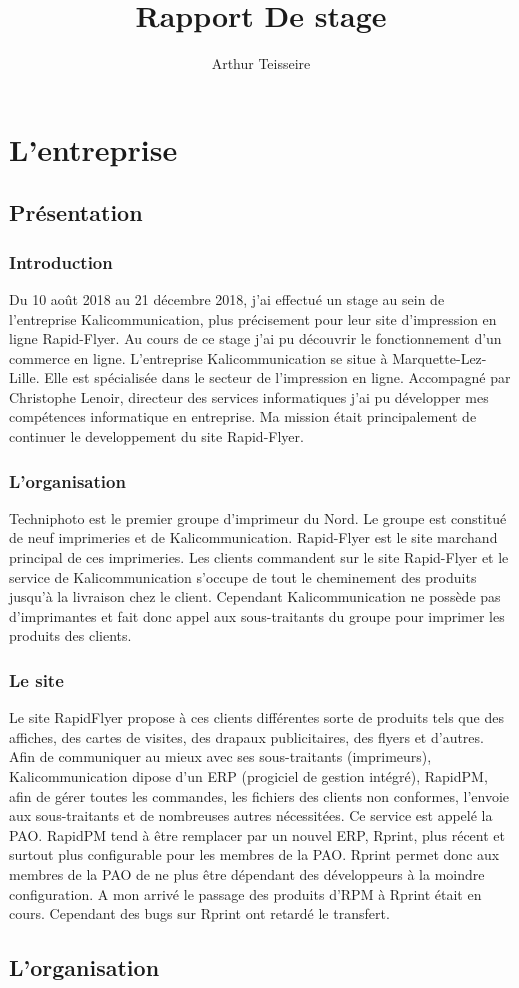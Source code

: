 \documentclass[a4paper]{report}
\title{Rapport De stage}
\author{Arthur Teisseire}
\begin{document}
\tableofcontents
\part{L'entreprise}
\chapter{Présentation}
\section{Introduction}
Du 10 août 2018 au 21 décembre 2018, j'ai effectué un stage au sein de l'entreprise Kalicommunication, plus précisement pour leur site d'impression en ligne Rapid-Flyer. Au cours de ce stage j'ai pu découvrir le fonctionnement d'un commerce en ligne.\newline
L'entreprise Kalicommunication se situe à Marquette-Lez-Lille. Elle est spécialisée dans le secteur de l'impression en ligne.\newline
Accompagné par Christophe Lenoir, directeur des services informatiques j'ai pu développer mes compétences informatique en entreprise. Ma mission  était principalement de continuer le developpement du site Rapid-Flyer.
\section{L'organisation}
Techniphoto est le premier groupe d'imprimeur du Nord. Le groupe est constitué de neuf %
imprimeries et de Kalicommunication. Rapid-Flyer est le site marchand principal de ces imprimeries. Les clients commandent sur le site Rapid-Flyer et le service de Kalicommunication s'occupe de tout le cheminement des produits jusqu'à la livraison chez le client. Cependant Kalicommunication ne possède pas d'imprimantes et fait donc appel aux sous-traitants du groupe pour imprimer les produits des clients.

\section{Le site}
Le site RapidFlyer propose à ces clients différentes sorte de produits tels que des affiches, des cartes de visites, des drapaux publicitaires, des flyers et d’autres. 
Afin de communiquer au mieux avec ses sous-traitants (imprimeurs), Kalicommunication dipose d’un ERP (progiciel de gestion intégré), RapidPM, afin de gérer toutes les commandes, les fichiers des clients non conformes, l’envoie aux sous-traitants et de nombreuses autres nécessitées. Ce service est appelé la PAO. RapidPM tend à être remplacer par un nouvel ERP, Rprint, plus récent et surtout plus configurable pour les membres de la PAO. Rprint permet donc aux membres de la PAO de ne plus être dépendant des développeurs à la moindre configuration. A mon arrivé le passage des produits d’RPM à Rprint était en cours. Cependant des bugs sur Rprint ont retardé le transfert. %

\chapter{L'organisation}
\end{document}
